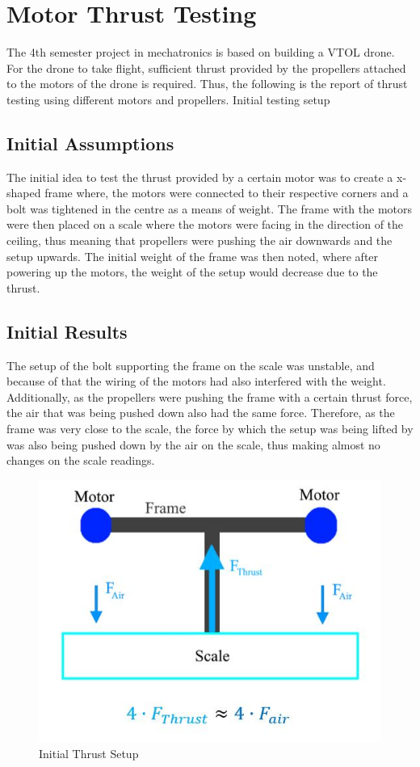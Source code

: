 \section{Motor Thrust Testing}\label{appendix_thrust}
The 4th semester project in mechatronics is based on building a VTOL drone. For the drone to take flight, 
sufficient thrust provided by the propellers attached to the motors of the drone is required. Thus,
the following is the report of thrust testing using different motors and propellers.
Initial testing setup

\subsection{Initial Assumptions}
The initial idea to test the thrust provided by a certain motor was to create a x-shaped frame where, 
the motors were connected to their respective corners and a bolt was tightened in the centre as a means of weight. 
The frame with the motors were then placed on a scale where the motors were facing in the direction of the ceiling, 
thus meaning that propellers were pushing the air downwards and the setup upwards. The initial weight of the frame was then noted, 
where after powering up the motors, the weight of the setup would decrease due to the thrust. 

\subsection{Initial Results}
The setup of the bolt supporting the frame on the scale was unstable, and because of that the wiring of the motors had also
interfered with the weight. Additionally, as the propellers were pushing the frame with a certain thrust force, 
the air that was being pushed down also had the same force. Therefore, as the frame was very close to the scale, 
the force by which the setup was being lifted by was also being pushed down by the air on the scale, thus making almost no 
changes on the scale readings. 

\begin{figure}
    \includegraphics[width=\linewidth]{pictures/control/Motor thrust 1.jpg}
    \caption{Initial Thrust Setup}
    \label{fig:Initial Thrust Setup}

\end{figure}

